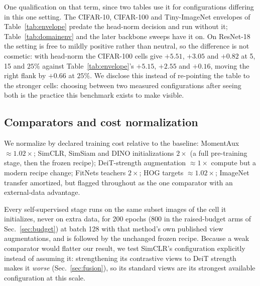 One qualification on that term, since two tables use it for configurations
differing in this one setting. The CIFAR-10, CIFAR-100 and Tiny-ImageNet
envelopes of Table~\ref{tab:envelope} predate the head-norm decision and run
without it; Table~\ref{tab:domainenv} and the later backbone sweeps have it on.
On ResNet-18 the setting is free to mildly positive rather than neutral, so the
difference is not cosmetic: with head-norm the CIFAR-100 cells give $+5.51$,
$+3.05$ and $+0.82$ at 5, 15 and $25\%$ against Table~\ref{tab:envelope}'s
$+5.15$, $+2.55$ and $+0.16$, moving the right flank by $+0.66$ at $25\%$. We disclose this instead of re-pointing the table to the stronger cells:
choosing between two measured configurations after seeing both is the
practice this benchmark exists to make visible.

\subsection{Comparators and cost normalization}\label{sec:comparators}
We normalize by declared training cost relative to the baseline: MomentAux
${\approx}1.02\times$; SimCLR, SimSiam and DINO initializations $2\times$ (a
full pre-training stage, then the frozen recipe); DeiT-strength augmentation
\citep{touvron2021deit} ${\approx}1\times$ compute but a modern recipe change;
FitNets teachers $2\times$; HOG targets ${\approx}1.02\times$; ImageNet
transfer amortized, but flagged throughout as the one comparator with an
external-data advantage.

Every self-supervised stage runs on the same subset images of the cell it
initializes, never on extra data, for 200 epochs (800 in the raised-budget arms of
Sec.~\ref{sec:budget}) at batch 128 with that
method's own published view augmentations, and is followed by the unchanged
frozen recipe. Because a weak comparator would flatter our result, we test
SimCLR's configuration explicitly instead of assuming it: strengthening its
contrastive views to DeiT strength makes it \emph{worse}
(Sec.~\ref{sec:fusion}), so its standard views are its strongest available
configuration at this scale.

